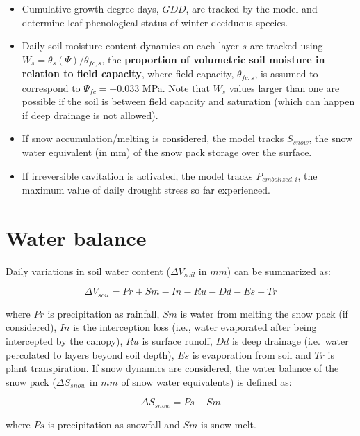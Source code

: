 \documentclass[]{book}
\providecommand{\tightlist}{%
  \setlength{\itemsep}{0pt}\setlength{\parskip}{0pt}}
\begin{document}
\begin{itemize}
\tightlist
\item
  Cumulative growth degree days, \(GDD\), are tracked by the model and
  determine leaf phenological status of winter deciduous species.
\item
  Daily soil moisture content dynamics on each layer \(s\) are tracked
  using \(W_s = \theta_s(\Psi)/ \theta_{fc,s}\), the \textbf{proportion
  of volumetric soil moisture in relation to field capacity}, where
  field capacity, \(\theta_{fc,s}\), is assumed to correspond to
  \(\Psi_{fc} = -0.033\) MPa. Note that \(W_s\) values larger than one
  are possible if the soil is between field capacity and saturation
  (which can happen if deep drainage is not allowed).
\item
  If snow accumulation/melting is considered, the model tracks
  \(S_{snow}\), the snow water equivalent (in mm) of the snow pack
  storage over the surface.
\item
  If irreversible cavitation is activated, the model tracks
  \(P_{embolized,i}\), the maximum value of daily drought stress so far
  experienced.
\end{itemize}

\section{Water balance}\label{water-balance}

Daily variations in soil water content (\(\Delta{V_{soil}}\) in \(mm\))
can be summarized as:

\begin{equation}
\Delta{V_{soil}} = Pr + Sm - In - Ru - Dd - Es -Tr
\end{equation}

where \(Pr\) is precipitation as rainfall, \(Sm\) is water from melting
the snow pack (if considered), \(In\) is the interception loss (i.e.,
water evaporated after being intercepted by the canopy), \(Ru\) is
surface runoff, \(Dd\) is deep drainage (i.e.~water percolated to layers
beyond soil depth), \(Es\) is evaporation from soil and \(Tr\) is plant
transpiration. If snow dynamics are considered, the water balance of the
snow pack (\(\Delta{S_{snow}}\) in \(mm\) of snow water equivalents) is
defined as:

\begin{equation}
\Delta{S_{snow}} = Ps - Sm
\end{equation}

where \(Ps\) is precipitation as snowfall and \(Sm\) is snow melt.
\end{document}
